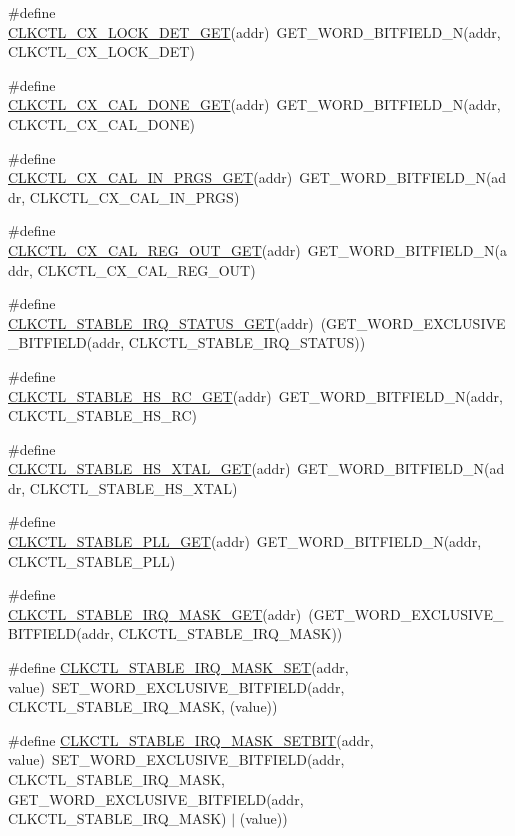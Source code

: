 \begin{DoxyCompactItemize}
\item 
\#define \hyperlink{a00544_ab924df73001aab9b0b06738a9a2cc394}{CLKCTL\_\-CX\_\-LOCK\_\-DET\_\-GET}(addr)~GET\_\-WORD\_\-BITFIELD\_\-N(addr, CLKCTL\_\-CX\_\-LOCK\_\-DET)
\item 
\#define \hyperlink{a00544_aa5140453f50863db3b7b5f12bd81e088}{CLKCTL\_\-CX\_\-CAL\_\-DONE\_\-GET}(addr)~GET\_\-WORD\_\-BITFIELD\_\-N(addr, CLKCTL\_\-CX\_\-CAL\_\-DONE)
\item 
\#define \hyperlink{a00544_a94a54a8d32b15af3e6c40faa9b687e5c}{CLKCTL\_\-CX\_\-CAL\_\-IN\_\-PRGS\_\-GET}(addr)~GET\_\-WORD\_\-BITFIELD\_\-N(addr, CLKCTL\_\-CX\_\-CAL\_\-IN\_\-PRGS)
\item 
\#define \hyperlink{a00544_af957c62a1fee7055f652ec4938359349}{CLKCTL\_\-CX\_\-CAL\_\-REG\_\-OUT\_\-GET}(addr)~GET\_\-WORD\_\-BITFIELD\_\-N(addr, CLKCTL\_\-CX\_\-CAL\_\-REG\_\-OUT)
\item 
\#define \hyperlink{a00544_a445bb3296f21f6b4a431c237e6e2601e}{CLKCTL\_\-STABLE\_\-IRQ\_\-STATUS\_\-GET}(addr)~(GET\_\-WORD\_\-EXCLUSIVE\_\-BITFIELD(addr, CLKCTL\_\-STABLE\_\-IRQ\_\-STATUS))
\item 
\#define \hyperlink{a00544_a53b1c8fb30a6f714261f46f1ac82d0da}{CLKCTL\_\-STABLE\_\-HS\_\-RC\_\-GET}(addr)~GET\_\-WORD\_\-BITFIELD\_\-N(addr, CLKCTL\_\-STABLE\_\-HS\_\-RC)
\item 
\#define \hyperlink{a00544_accd15bb023e4301af3d242720b4996ca}{CLKCTL\_\-STABLE\_\-HS\_\-XTAL\_\-GET}(addr)~GET\_\-WORD\_\-BITFIELD\_\-N(addr, CLKCTL\_\-STABLE\_\-HS\_\-XTAL)
\item 
\#define \hyperlink{a00544_a5cafb6306cf084315942fa1829929268}{CLKCTL\_\-STABLE\_\-PLL\_\-GET}(addr)~GET\_\-WORD\_\-BITFIELD\_\-N(addr, CLKCTL\_\-STABLE\_\-PLL)
\item 
\#define \hyperlink{a00544_a27a3531055e935ece328ca69abaa479c}{CLKCTL\_\-STABLE\_\-IRQ\_\-MASK\_\-GET}(addr)~(GET\_\-WORD\_\-EXCLUSIVE\_\-BITFIELD(addr, CLKCTL\_\-STABLE\_\-IRQ\_\-MASK))
\item 
\#define \hyperlink{a00544_a3779b12a948cf06f5bdfd82fdf455472}{CLKCTL\_\-STABLE\_\-IRQ\_\-MASK\_\-SET}(addr, value)~SET\_\-WORD\_\-EXCLUSIVE\_\-BITFIELD(addr, CLKCTL\_\-STABLE\_\-IRQ\_\-MASK, (value))
\item 
\#define \hyperlink{a00544_afe7e4146584c968523c7c419ec5c28ed}{CLKCTL\_\-STABLE\_\-IRQ\_\-MASK\_\-SETBIT}(addr, value)~SET\_\-WORD\_\-EXCLUSIVE\_\-BITFIELD(addr, CLKCTL\_\-STABLE\_\-IRQ\_\-MASK, GET\_\-WORD\_\-EXCLUSIVE\_\-BITFIELD(addr, CLKCTL\_\-STABLE\_\-IRQ\_\-MASK) $|$ (value))
\item 

\end{DoxyCompactItemize}
